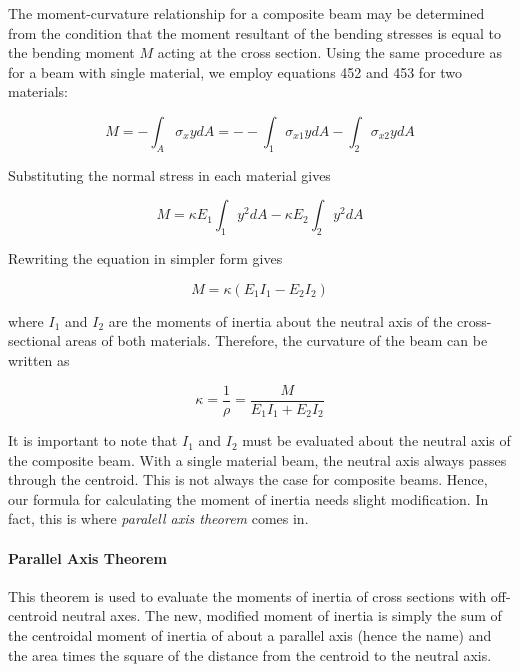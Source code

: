 \documentclass[
10pt,
a4paper,
openany,
svgnames,
]{book} %
\begin{document}
The moment-curvature relationship for a composite beam may be determined from the condition that the moment resultant of the bending stresses is equal to the bending moment $M$ acting at the cross section. Using the same procedure as for a beam with single material, we employ equations 452 and 453 for two materials:

\[M =  - \int_A \sigma _xydA  =  -  - \int_1 \sigma _{x1}ydA  - \int_2 \sigma _{x2}ydA \]

Substituting the normal stress in each material gives

\[M = \kappa E_1\int_1 y^2dA  - \kappa E_2\int_2 y^2dA \]

Rewriting the equation in simpler form gives

\begin{equation}
  M = \kappa (E_1I_1 - E_2I_2)
\end{equation}

where $I_1$ and $I_2$ are the moments of inertia about the neutral axis of the cross-sectional areas of both materials. Therefore, the curvature of the beam can be written as

\begin{equation}
  \kappa  = \frac{1}{\rho } = \frac{M}{E_1I_1 + E_2I_2}
\end{equation}

It is important to note that $I_1$ and $I_2$ must be evaluated about the neutral axis of the composite beam. With a single material beam, the neutral axis always passes through the centroid. This is not always the case for composite beams. Hence, our formula for calculating the moment of inertia needs slight modification. In fact, this is where \emph{paralell axis theorem} comes in.

\paragraph{Parallel Axis Theorem}

This theorem is used to evaluate the moments of inertia of cross sections with off-centroid neutral axes. The new, modified moment of inertia is simply the sum of the centroidal moment of inertia of about a parallel axis (hence the name) and the area times the square of the distance from the centroid to the neutral axis.
\end{document}

